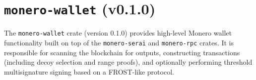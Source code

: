 \documentclass[12pt,a4paper]{article}
\begin{document}





\section{\texttt{monero-wallet} (v0.1.0)}
The \texttt{monero-wallet} crate (version 0.1.0) provides high-level Monero wallet functionality built on top of the 
\texttt{monero-serai} and \texttt{monero-rpc} crates. It is responsible for scanning
the blockchain for outputs, constructing transactions (including decoy selection and range
proofs), and optionally performing threshold multisignature signing based on a FROST-like protocol.
\end{document}
